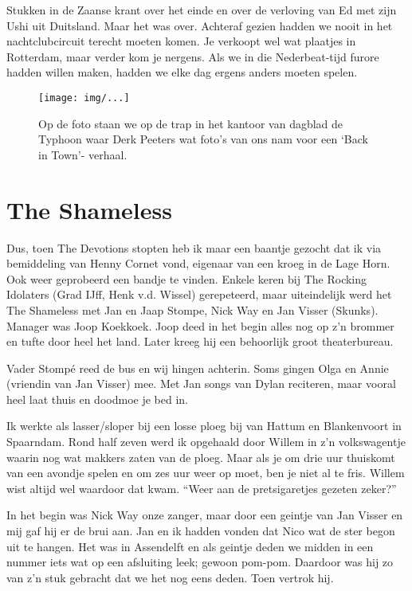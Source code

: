 \documentclass[10pt,twoside,openright]{memoir}
\begin{document}
Stukken in de Zaanse krant over het einde en over de verloving van Ed met zijn Ushi uit Duitsland. Maar het was over. 	
Achteraf gezien hadden we nooit in het nachtclubcircuit terecht moeten komen. Je verkoopt wel wat plaatjes in Rotterdam, maar verder kom je nergens. Als we in die Nederbeat-tijd furore hadden willen maken, hadden we elke dag ergens anders moeten spelen.

\begin{figure}[t]
\texttt{[image: img/...]}
\caption{Op de foto staan we op de trap in het kantoor van dagblad de Typhoon waar Derk Peeters wat foto’s van ons nam voor een ‘Back in Town’- verhaal. }
\end{figure}

\chapter{The Shameless} %
\label{cha:shameless}

Dus, toen The Devotions stopten heb ik maar een baantje gezocht dat ik via bemiddeling van Henny Cornet vond, eigenaar van een kroeg in de Lage Horn. Ook weer geprobeerd een bandje te vinden. Enkele keren bij The Rocking Idolaters (Grad IJff, Henk v.d. Wissel) gerepeteerd, maar uiteindelijk werd het The Shameless met Jan en Jaap Stompe, Nick Way en Jan Visser (Skunks). Manager was Joop Koekkoek. Joop deed in het begin alles nog op z’n brommer en tufte door heel het land. Later kreeg hij een behoorlijk groot theaterbureau. 

Vader Stompé reed de bus en wij hingen achterin. Soms gingen Olga en Annie (vriendin van Jan Visser) mee. Met Jan songs van Dylan reciteren, maar vooral heel laat thuis en doodmoe je bed in.

Ik werkte als lasser/sloper bij een losse ploeg bij van Hattum en Blankenvoort in Spaarndam. Rond half zeven werd ik opgehaald door Willem in z’n volkswagentje waarin nog wat makkers zaten van de ploeg. Maar als je om drie uur thuiskomt van een avondje spelen en om zes uur weer op moet, ben je niet al te fris. Willem wist altijd wel waardoor dat kwam. “Weer aan de pretsigaretjes gezeten zeker?”

In het begin was Nick Way onze zanger, maar door een geintje van Jan Visser en mij gaf hij er de brui aan. Jan en ik hadden vonden dat Nico wat de ster begon uit te hangen. Het was in Assendelft en als geintje deden we midden in een nummer iets wat op een afsluiting leek; gewoon pom-pom. Daardoor was hij zo van z’n stuk gebracht dat we het nog eens deden. Toen vertrok hij.
\end{document}
